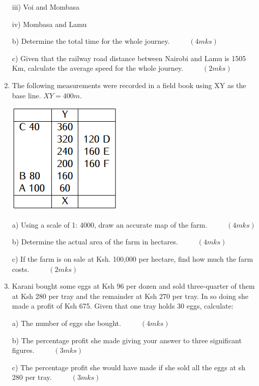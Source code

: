 \documentclass[
  a4paperpaper,
]{scrbook}
\begin{document}
\begin{tcolorbox}
\begin{enumerate}
  iii) Voi and Mombasa

  iv) Mombasa and Lamu

  b) Determine the total time for the whole journey.
  \(\hspace{1cm} (4mks)\)

  c) Given that the railway road distance between Nairobi and Lamu is
  1505 Km, calculate the average speed for the whole journey.
  \(\hspace{1cm} (2mks)\)
\item
  The following measurements were recorded in a field book using XY as
  the base line. \(XY = 400m\).

  \includegraphics{figures/Md4_Q19.png}

  a) Using a scale of 1: 4000, draw an accurate map of the farm.
  \(\hspace{1cm} (4mks)\)

  b) Determine the actual area of the farm in hectares.
  \(\hspace{1cm} (4mks)\)

  c) If the farm is on sale at Ksh. 100,000 per hectare, find how much
  the farm costs. \(\hspace{1cm}(2mks)\)
\item
  Karani bought some eggs at Ksh 96 per dozen and sold three-quarter of
  them at Ksh 280 per tray and the remainder at Ksh 270 per tray. In so
  doing she made a profit of Ksh 675. Given that one tray holds 30 eggs,
  calculate:

  a) The number of eggs she bought. \(\hspace{1cm} (4mks)\)

  b) The percentage profit she made giving your answer to three
  significant figures. \(\hspace{1cm}(3mks)\)

  c) The percentage profit she would have made if she sold all the eggs
  at sh 280 per tray. \(\hspace{1cm} (3mks)\)
\end{enumerate}

\end{tcolorbox}
\end{document}
